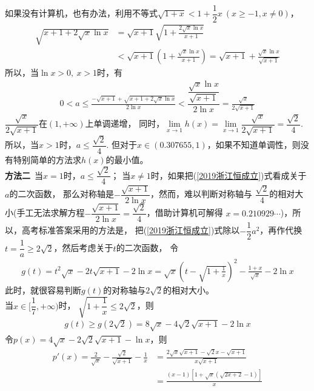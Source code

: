 \begin{enumerate}[label={【\textbf{例\thechapter.\arabic*}】},
 leftmargin=\inteval{\myenumleftmargin}pt,
 itemsep=\inteval{\myenumitempsep}pt,
 itemindent=\inteval{\myenumitemindent}pt]
如果没有计算机，也有办法，利用不等式$ \sqrt{1+x}< 
1+\dfrac{1}{2}x\ (x\geq -1,x\neq 0) $，
\begin{align}
    \sqrt{x+1+2\sqrt{x}\ln x} 
    &=\sqrt{x+1}\sqrt{1+\frac{2\sqrt{x}\ln x}{x+1}} \nonumber \\
    & <\sqrt{x+1}\left(1+\frac{\sqrt{x}\ln x}{x+1}\right)=
    \sqrt{x+1}+\frac{\sqrt{x}\ln x}{\sqrt{x+1}} \label{2019浙江根号缩放}
\end{align}
所以，当$ \ln x>0,\ x>1 $时，有
\begin{align}\label{2019浙江00极限计算}
    0<a\leq \frac{-\sqrt{x+1}+\sqrt{x+1+2\sqrt{x}\ln x}}{2\ln x}
    <\dfrac{\dfrac{\sqrt{x}\ln x}{\sqrt{x+1}}}{2\ln x}=
    \frac{\sqrt{x}}{2\sqrt{x+1}}
\end{align}
$ \dfrac{\sqrt{x}}{2\sqrt{x+1}} $在$ (1,+\infty) $上单调递增，
同时，$ \lim\limits_{x\to 1}h(x)=
\lim\limits_{x\to 1}\dfrac{\sqrt{x}}{2\sqrt{x+1}}=
\dfrac{\sqrt{2}}{4} $.所以，当$ x>1 $时，$ a\leq \dfrac{\sqrt{2}}{4} $.
但对于$ x\in(0.307655,1) $，如果不知道单调性，则没有特别简单的方法求$ h(x) $的最小值。
\\
\textbf{方法二}\ 当$ x=1 $时，$ a\leq \dfrac{\sqrt{2}}{4} $；
当$ x\neq 1 $时，如果把(\ref{2019浙江恒成立})式看成关于$ a $的二次函数，
那么对称轴是$ -\dfrac{\sqrt{x+1}}{2\ln x} $，然而，难以判断对称轴与
$ \dfrac{\sqrt{2}}{4} $的相对大小(手工无法求解方程$ -\dfrac{
    \sqrt{x+1}}{2\ln x}=\dfrac{\sqrt{2}}{4} $，借助计算机可解得
$ x=0.210929\cdots $)，所以，高考标准答案采用的方法是，
把(\ref{2019浙江恒成立})式除以$ -\dfrac{1}{2}a^2 $，再作代换
$ t=\dfrac{1}{a}\geq 2\sqrt{2} $，然后考虑关于$ t $的二次函数，
令
\begin{gather*}
    g(t)=t^2\sqrt{x}-2t\sqrt{x+1}-2\ln x=\sqrt{x}\left(t-
    \sqrt{1+\frac{1}{x}}\right)^2-\frac{1+x}{\sqrt{x}}-2\ln x
\end{gather*}
此时，就很容易判断$ g(t) $的对称轴与$ 2\sqrt{2} $的相对大小。\\
 当$ x\in \Big[\dfrac{1}{7},+\infty\Big) $时，
$ \sqrt{1+\dfrac{1}{x}}\leq 2\sqrt{2} $，则
\begin{gather*}
    g(t)\geq g(2\sqrt{2})=8\sqrt{x}-4\sqrt{2}\sqrt{x+1}-2\ln x
\end{gather*}
令$ p(x)=4\sqrt{x}-2\sqrt{2}\sqrt{x+1}-\ln x $，则
\begin{align}
    p'(x)=\frac{2}{\sqrt{x}}-\frac{\sqrt{2}}{\sqrt{x+1}}-
    \frac{1}{x} &=\frac{2\sqrt{x}\sqrt{x+1}-\sqrt{2}x-
        \sqrt{x+1}}{x\sqrt{x+1}}\label{2019浙江根式方程}\\ 
    &=\frac{(x-1)[1+\sqrt{x}(\sqrt{2 x+2}-1)]}{x 
}
\end{align}
\end{enumerate}
